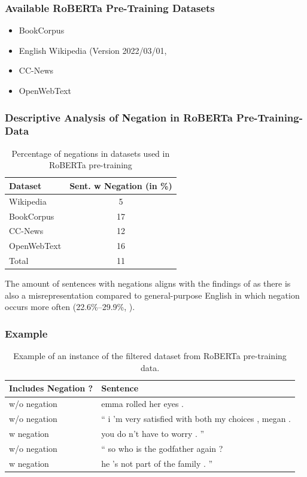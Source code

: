 \documentclass{article}
\begin{document}
\subsubsection{Available RoBERTa Pre-Training Datasets}
\begin{itemize}
    \item BookCorpus \citep{Zhu_2015_ICCV}
    \item English Wikipedia (Version 2022/03/01, \cite{wikidump}
    \item CC-News \citep{Hamborg2017}
    \item OpenWebText \citep{Gokaslan2019OpenWeb}
\end{itemize}

\subsubsection{Descriptive Analysis of Negation in RoBERTa Pre-Training-Data}
\begin{table}[!h]
    \centering
    \begin{tabular}{l|c}
        Dataset         & Sent. w Negation (in \%) \\ \hline
        Wikipedia       & 5 \\
        BookCorpus      & 17 \\
        CC-News         & 12 \\
        OpenWebText     & 16 \\
        Total           & 11 \\
    \end{tabular}
    \caption{Percentage of negations in datasets used in RoBERTa pre-training}
    \label{tab:data_stats}
\end{table}

The amount of sentences with negations aligns with the findings of \cite{hossain-etal-2022-analysis} as there is also a misrepresentation compared to general-purpose English in which negation occurs more often (22.6\%–29.9\%, \cite{hossain-etal-2022-analysis}).
\newpage

\subsubsection{Example}
\begin{table}[!h]
    \centering
    \begin{tabular}{l|l}
        Includes Negation ? & Sentence \\ \hline
         w/o negation   & emma rolled her eyes .  \\
         w/o negation   & `` i 'm very satisfied with both my choices , megan . \\
         w negation     & you do n't have to worry . '' \\
         w/o negation   & `` so who is the godfather again ? \\
         w negation    & he 's not part of the family . ''
    \end{tabular}
    \caption{Example of an instance of the filtered dataset from RoBERTa pre-training data.}
    \label{tab:filtered_data_example}
\end{table}
\end{document}
